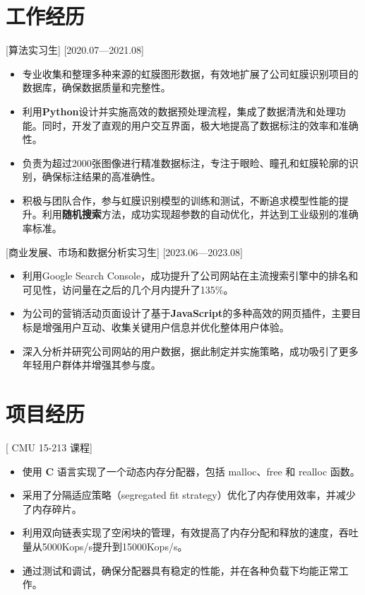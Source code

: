 \documentclass{resume}
\begin{document}
\section{工作经历}

[算法实习生]
[2020.07—2021.08]

\begin{itemize}
  \item 专业收集和整理多种来源的虹膜图形数据，有效地扩展了公司虹膜识别项目的数据库，确保数据质量和完整性。
  \item 利用\textbf{Python}设计并实施高效的数据预处理流程，集成了数据清洗和处理功能。同时，开发了直观的用户交互界面，极大地提高了数据标注的效率和准确性。
  \item 负责为超过2000张图像进行精准数据标注，专注于眼睑、瞳孔和虹膜轮廓的识别，确保标注结果的高准确性。
  \item 积极与团队合作，参与虹膜识别模型的训练和测试，不断追求模型性能的提升。利用\textbf{随机搜索}方法，成功实现超参数的自动优化，并达到工业级别的准确率标准。
\end{itemize}

[商业发展、市场和数据分析实习生]
[2023.06—2023.08]

\begin{itemize}
  \item 利用Google Search Console，成功提升了公司网站在主流搜索引擎中的排名和可见性，访问量在之后的几个月内提升了135\%。
  \item 为公司的营销活动页面设计了基于\textbf{JavaScript}的多种高效的网页插件，主要目标是增强用户互动、收集关键用户信息并优化整体用户体验。
  \item 深入分析并研究公司网站的用户数据，据此制定并实施策略，成功吸引了更多年轻用户群体并增强其参与度。
\end{itemize}

\section{项目经历}

[ \textnormal{CMU 15-213} 课程]
\begin{itemize}
  \item 使用 \textbf{C} 语言实现了一个动态内存分配器，包括 malloc、free 和 realloc 函数。
  \item 采用了分隔适应策略（segregated fit strategy）优化了内存使用效率，并减少了内存碎片。
  \item 利用双向链表实现了空闲块的管理，有效提高了内存分配和释放的速度，吞吐量从5000Kops/s提升到15000Kops/s。
  \item 通过测试和调试，确保分配器具有稳定的性能，并在各种负载下均能正常工作。
\end{itemize}
\end{document}
